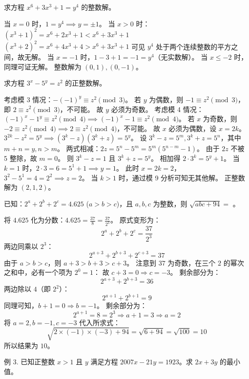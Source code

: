 \begin{questions}
\question 求方程 $x^6 + 3x^3 + 1 = y^4$ 的整数解。
\begin{solution}
当 $x = 0$ 时，$1 = y^4 \implies y = \pm 1$。
当 $x > 0$ 时：
$(x^3 + 1)^2 = x^6 + 2x^3 + 1 < x^6 + 3x^3 + 1$
$(x^3 + 2)^2 = x^6 + 4x^3 + 4 > x^6 + 3x^3 + 1$
可见 $y^4$ 处于两个连续整数的平方之间，故无解。
当 $x = -1$ 时，$1 - 3 + 1 = -1 = y^4$（无实数解）。
当 $x \le -2$ 时，同理可证无解。
整数解为 $(0, 1), (0, -1)$。
\end{solution}

\question 求方程 $3^x - 5^y = z^2$ 的正整数解。
\begin{solution}
考虑模 3 情况：$-(-1)^y \equiv z^2 \pmod 3$。
若 $y$ 为偶数，则 $-1 \equiv z^2 \pmod 3$，即 $2 \equiv z^2 \pmod 3$，不可能。
故 $y$ 必须为奇数。
考虑模 4 情况：$(-1)^x - 1^y \equiv z^2 \pmod 4 \implies (-1)^x - 1 \equiv z^2 \pmod 4$。
若 $x$ 为奇数，则 $-2 \equiv z^2 \pmod 4 \implies 2 \equiv z^2 \pmod 4$，不可能。
故 $x$ 必须为偶数，设 $x = 2k$。
$3^{2k} - z^2 = 5^y \implies (3^k - z)(3^k + z) = 5^y$。
设 $3^k - z = 5^m, 3^k + z = 5^n$，其中 $m + n = y, n > m$。
两式相减：$2z = 5^n - 5^m = 5^m(5^{n-m} - 1)$。
由于 $2z$ 不被 5 整除，故 $m = 0$。
则 $3^k - z = 1$ 且 $3^k + z = 5^y$。
相加得 $2 \cdot 3^k = 5^y + 1$。
当 $k = 1$ 时，$2 \cdot 3 = 6 = 5^1 + 1 \implies y = 1$。
此时 $x = 2k = 2$，$3^2 - 5^1 = 4 = 2^2 \implies z = 2$。
当 $k > 1$ 时，通过模 9 分析可知无其他解。
正整数解为 $(2, 1, 2)$。
\end{solution}

\question 已知：$2^a + 2^b + 2^c = 4.625$ ($a > b > c$)，且 $a, b, c$ 为整数，则 $\sqrt{abc + 94} =$ \underline{\hspace{1cm}}。

\begin{solution}
将 $4.625$ 化为分数：$4.625 = \frac{37}{8} = \frac{37}{2^3}$。
原式变形为：
\[
2^a + 2^b + 2^c = \frac{37}{2^3}
\]
两边同乘以 $2^3$：
\[
2^{a+3} + 2^{b+3} + 2^{c+3} = 37
\]
由于 $a > b > c$，则 $a+3 > b+3 > c+3$。
注意到 $37$ 为奇数，在三个 $2$ 的幂次之和中，必有一个项为 $2^0 = 1$：
故 $c + 3 = 0 \Rightarrow c = -3$。
剩余部分为：
\[
2^{a+3} + 2^{b+3} = 36
\]
两边除以 $4$（即 $2^2$）：
\[
2^{a+1} + 2^{b+1} = 9
\]
同理可知，$b + 1 = 0 \Rightarrow b = -1$。
剩余部分为：
\[
2^{a+1} = 8 = 2^3 \Rightarrow a + 1 = 3 \Rightarrow a = 2
\]
将 $a = 2, b = -1, c = -3$ 代入所求式：
\[
\sqrt{2 \times (-1) \times (-3) + 94} = \sqrt{6 + 94} = \sqrt{100} = 10
\]
所以结果为 $10$。
\end{solution}

\question 例 3. 已知正整数 $x > 1$ 且 $y$ 满足方程 $2007x - 21y = 1923$。求 $2x + 3y$ 的最小值。


\end{questions}
